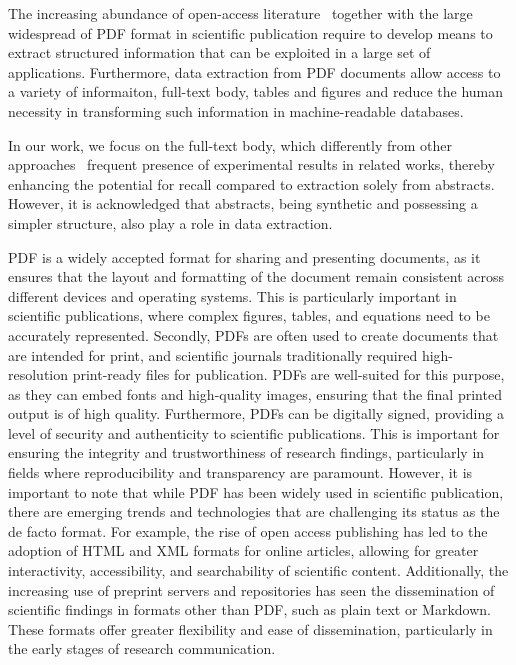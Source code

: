 The increasing abundance of open-access literature~\cite{laakso2011the} together with the large widespread of PDF format in scientific publication require to develop means to extract structured information that can be exploited in a large set of applications. 
Furthermore, data extraction from PDF documents allow access to a variety of informaiton, full-text body, tables and figures and reduce the human necessity in transforming such information in machine-readable databases.

In our work, we focus on the full-text body, which differently from other approaches~\cite{} frequent presence of experimental results in related works, thereby enhancing the potential for recall compared to extraction solely from abstracts. 
However, it is acknowledged that abstracts, being synthetic and possessing a simpler structure, also play a role in data extraction.



PDF is a widely accepted format for sharing and presenting documents, as it ensures that the layout and formatting of the document remain consistent across different devices and operating systems. This is particularly important in scientific publications, where complex figures, tables, and equations need to be accurately represented.
Secondly, PDFs are often used to create documents that are intended for print, and scientific journals traditionally required high-resolution print-ready files for publication. PDFs are well-suited for this purpose, as they can embed fonts and high-quality images, ensuring that the final printed output is of high quality.
Furthermore, PDFs can be digitally signed, providing a level of security and authenticity to scientific publications. This is important for ensuring the integrity and trustworthiness of research findings, particularly in fields where reproducibility and transparency are paramount.
However, it is important to note that while PDF has been widely used in scientific publication, there are emerging trends and technologies that are challenging its status as the de facto format. For example, the rise of open access publishing has led to the adoption of HTML and XML formats for online articles, allowing for greater interactivity, accessibility, and searchability of scientific content.
Additionally, the increasing use of preprint servers and repositories has seen the dissemination of scientific findings in formats other than PDF, such as plain text or Markdown. These formats offer greater flexibility and ease of dissemination, particularly in the early stages of research communication.


